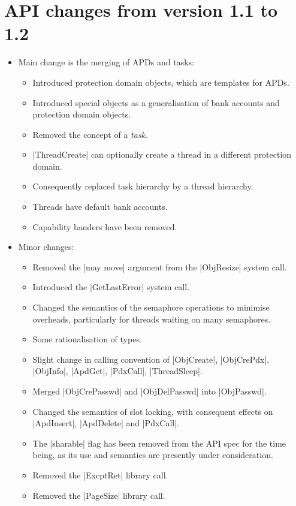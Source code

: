 \documentclass[a4paper,11pt,twoside,dvips]{report}
\begin{document}
\section{API changes from version 1.1 to 1.2}

\begin{itemize}
\item Main change is the merging of APDs and tasks:
\begin{itemize}

\item Introduced protection domain objects, which are
templates for APDs.
\item Introduced special objects as a generalisation of bank accounts
and protection domain objects.
\item Removed the concept of a \emph{task}.
\item |ThreadCreate| can optionally create a thread in a different
protection domain.
\item Consequently replaced task hierarchy by a thread hierarchy.
\item Threads have default bank accounts.
\item Capability handers have been removed.
\end{itemize}


\item Minor changes:
\begin{itemize}

\item Removed the |may move| argument from the |ObjResize| system call.

\item Introduced the |GetLastError| system call.

\item Changed the semantics of the semaphore operations to minimise
overheads, particularly for threads waiting on many semaphores.

\item Some rationalisation of types.

\item Slight change in calling convention of |ObjCreate|, |ObjCrePdx|,
|ObjInfo|, |ApdGet|, |PdxCall|, |ThreadSleep|.

\item Merged |ObjCrePasswd| and |ObjDelPasswd| into |ObjPasswd|.

\item Changed the semantics of slot locking, with consequent effects on
|ApdInsert|, |ApdDelete| and |PdxCall|.

\item The |sharable| flag has been removed from the API spec for the
time being, as its use and semantics are presently under consideration.

\item Removed the |ExcptRet| library call.

\item Removed the |PageSize| library call.
\end{itemize}
\end{itemize}
\end{document}

